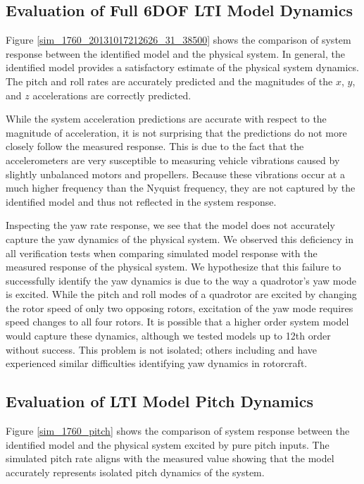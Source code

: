 \subsection{Evaluation of Full 6DOF LTI Model Dynamics}
Figure \ref{sim_1760_20131017212626_31_38500} shows the comparison of system response between the identified model and the physical system. In general, the identified model provides a satisfactory estimate of the physical system dynamics. The pitch and roll rates are accurately predicted and the magnitudes of the $x$, $y$, and $z$ accelerations are correctly predicted. 

While the system acceleration predictions are accurate with respect to the magnitude of acceleration, it is not surprising that the predictions do not more closely follow the measured response. This is due to the fact that the accelerometers are very susceptible to measuring vehicle vibrations caused by slightly unbalanced motors and propellers. Because these vibrations occur at a much higher frequency than the Nyquist frequency, they are not captured by the identified model and thus not reflected in the system response.

Inspecting the yaw rate response, we see that the model does not accurately capture the yaw dynamics of the physical system. We observed this deficiency in all verification tests when comparing simulated model response with the measured response of the physical system. We hypothesize that this failure to successfully identify the yaw dynamics is due to the way a quadrotor's yaw mode is excited. While the pitch and roll modes of a quadrotor are excited by changing the rotor speed of only two opposing rotors, excitation of the yaw mode requires speed changes to all four rotors. It is possible that a higher order system model would capture these dynamics, although we tested models up to 12th order without success. This problem is not isolated; others including \cite{lee2011attitude} and \cite{mettler2000system} have experienced similar difficulties identifying yaw dynamics in rotorcraft.

\subsection{Evaluation of LTI Model Pitch Dynamics}
Figure \ref{sim_1760_pitch} shows the comparison of system response between the identified model and the physical system excited by pure pitch inputs. The simulated pitch rate aligns with the measured value showing that the model accurately represents isolated pitch dynamics of the system.


